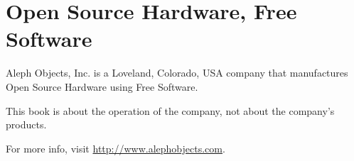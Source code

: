 %
%
%
%
%

\section{Open Source Hardware, Free Software}

Aleph Objects, Inc. is a Loveland, Colorado, USA company that manufactures
Open Source Hardware using Free Software.

This book is about the operation of the company, not about the
company's products.

For more info, visit \url{http://www.alephobjects.com}.
